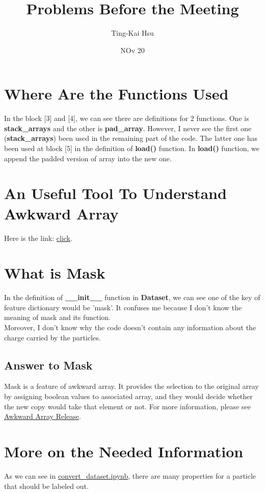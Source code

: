 \documentclass[12pt]{article}
\title{Problems Before the Meeting}
\author{Ting-Kai Hsu}
\date{NOv 20}
\numberwithin{equation}{section}
\begin{document}
\maketitle
\tableofcontents

\section{Where Are the Functions Used}

In the block [3] and [4], we can see there are definitions for 2 functions. One is \textbf{stack\_arrays} and the other is \textbf{pad\_array}. 
However, I never see the first one (\textbf{stack\_arrays}) been used in the remaining part of the code. 
The latter one has been used at block [5] in the definition of \textbf{load()} function. 
In \textbf{load()} function, we append the padded version of array into the new one.

\section{An Useful Tool To Understand Awkward Array}
Here is the link: \href{https://cms-opendata-workshop.github.io/workshop2022-lesson-cpp-root-python/08-awkward/}{click}.

\section{What is Mask}
In the definition of \textbf{\_\_init\_\_} function in \textbf{Dataset}, we can see one of the key of feature dictionary would be 'mask'. 
It confuses me because I don't know the meaning of mask and its function.\\\indent 
Moreover, I don't know why the code doesn't contain any information about the charge carried by the particles.
\subsection{Answer to Mask}
Mask is a feature of awkward array.
It provides the selection to the original array by assigning boolean values to associated array, and they would decide whether the new copy would take that element or not.
For more information, please see \href{https://github.com/scikit-hep/awkward-0.x/blob/0.12.0/docs/classes.adoc#jaggedarray}{Awkward Array Release}.
\section{More on the Needed Information}
As we can see in \href{https://github.com/hqucms/ParticleNet/blob/master/tf-keras/convert_dataset.ipynb}{convert\_dataset.ipynb}, there are many properties for a particle that should be labeled out.
\end{document}
